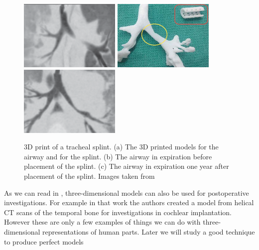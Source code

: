 \begin{figure}[htb] %
   \centering
   \includegraphics[width=0.33\linewidth]{images/TrachealSplint0.png}\hfill
   \includegraphics[width=0.33\linewidth]{images/TrachealSplint1.png}\hfill
   \includegraphics[width=0.33\linewidth]{images/TrachealSplint2.png}
   \caption[3D print of a tracheal splint]{3D print of a tracheal splint. (a) The 3D printed models for the airway and for the splint. (b) The airway in expiration before placement of the splint. (c) The airway in expiration one year after placement of the splint. Images taken from~\cite{Zopf}}
   \label{fig:TrachealSplint}
\end{figure}

As we can read in \cite{Himi}, three-dimensional models can also be used for postoperative investigations. For example in that work the authors created a model from helical CT scans of the temporal bone for investigations in cochlear implantation.\\

However these are only a few examples of things we can do with three-dimensional representations of human parts. Later we will study a good technique to produce perfect models
